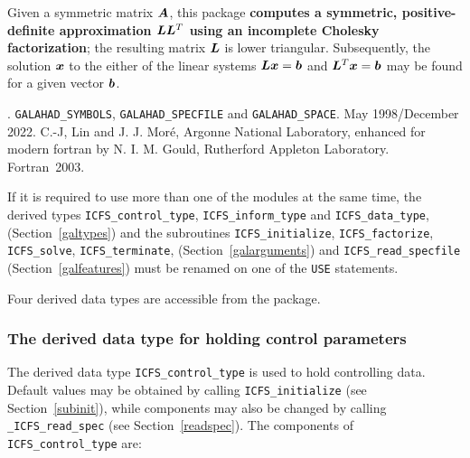 \documentclass{galahad}
\newcommand{\packagename}{ICFS}
\newcommand{\fullpackagename}{\libraryname\_\packagename}
\begin{document}
\galheader


\galsummary
Given a symmetric matrix ${\bm{A}}$, this package
{\bf computes a symmetric, positive-definite approximation
${\bm{L}} {\bm{L}}^T$ using an incomplete Cholesky factorization}; the
resulting matrix ${\bm{L}}$ is lower triangular.
Subsequently, the solution ${\bm{x}}$ to the either of the linear systems
${\bm{L}} {\bm{x}} = {\bm{b}}$ and ${\bm{L}}^T {\bm{x}} = {\bm{b}}$
may be found for a given vector ${\bm{b}}$.


\galattributes
\galversions{\tt  \fullpackagename\_single, \fullpackagename\_double}.
\galuses
{\tt GALAHAD\_SY\-M\-BOLS},
{\tt GALAH\-AD\-\_\-SP\-ECFILE} and
{\tt GALAHAD\_SPACE}.
\galdate May 1998/December 2022.
\galorigin C.-J, Lin and J. J. Mor\'{e}, Argonne National Laboratory,
enhanced for modern fortran by N. I. M. Gould, Rutherford Appleton Laboratory.
\gallanguage Fortran~2003.


\galhowto



\noindent
If it is required to use more than one of the modules at the same time, 
the derived types
{\tt \packagename\_control\_type},
{\tt \packagename\_inform\_type}
and
{\tt \packagename\_data\_type},
(Section~\ref{galtypes})
and the subroutines
{\tt \packagename\_initialize},
{\tt \packagename\_\-factorize},
{\tt \packagename\_\-solve},
{\tt \packagename\_terminate},
(Section~\ref{galarguments})
and
{\tt \packagename\_read\_specfile}
(Section~\ref{galfeatures})
must be renamed on one of the {\tt USE} statements.





\galtypes
Four derived data types are accessible from the package.


\subsubsection{The derived data type for holding control
 parameters}\label{typecontrol}
The derived data type
{\tt \packagename\_control\_type}
is used to hold controlling data. Default values may be obtained by calling
{\tt \packagename\_initialize}
(see Section~\ref{subinit}),
while components may also be changed by calling
{\tt \fullpackagename\_read\-\_spec}
(see Section~\ref{readspec}).
The components of
{\tt \packagename\_control\_type}
are:
\end{document}
